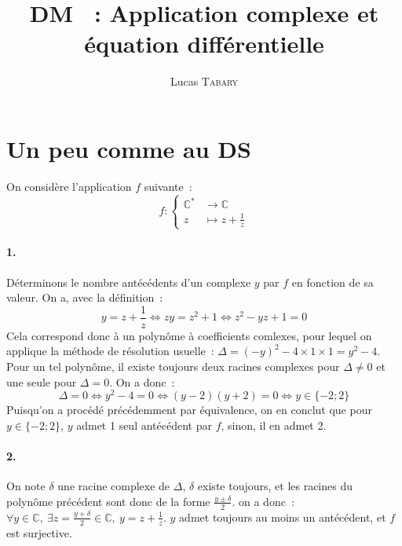 \documentclass{article}
\title{\textbf{DM \No 3~: Application complexe et équation différentielle}}
\author{Lucas \textsc{Tabary}}
\date{}
\begin{document}
  \maketitle
  \hrulefill

  \vspace{2cm}

  \hrulefill

  \section{Un peu comme au DS}
  On considère l'application $f$ suivante~:
    \begin{displaymath}
      f\colon\left\{
      \begin{aligned}
          \mathbb{C}^*\!\!&\longrightarrow \mathbb{C}\\
          z&\longmapsto z+\frac{1}{z}
      \end{aligned}
      \right.
    \end{displaymath}
    \paragraph{1.}
    Déterminons le nombre antécédents d'un complexe $y$ par $f$ en fonction de sa valeur. On a, avec la définition~:
    \begin{displaymath}
      y = z+\frac{1}{z} \iff zy = z^2 + 1 \iff z^2 - yz + 1 = 0
    \end{displaymath}
    Cela correspond donc à un polynôme à coefficients comlexes, pour lequel on applique la méthode de résolution usuelle~: $\Delta = (-y)^2 - 4 \times 1 \times 1 = y^2 - 4$. Pour un tel polynôme, il existe toujours deux racines complexes pour $\Delta \neq 0$ et une seule pour $\Delta = 0$. On a donc~:
    \begin{displaymath}
      \Delta = 0 \iff y^2 - 4 = 0 \iff (y-2)(y+2) = 0 \iff y\in\{-2;2\}
    \end{displaymath}
    Puisqu'on a procédé précédemment par équivalence, on en conclut que pour $y\in\{-2;2\}$, $y$ admet 1 seul antécédent par $f$, sinon, il en admet 2.

    \paragraph{2.}
    On note $\delta$ une racine complexe de $\Delta$, $\delta$ existe toujours, et les racines du polynôme précédent sont donc de la forme $\frac{y\pm\delta}{2}$. on a donc~: $\forall y\in\mathbb{C},\ \exists z=\frac{y+\delta}{2}\in\mathbb{C},\ y = z+\frac{1}{z}$. $y$ admet toujours au moins un antécédent, et $f$ est surjective.
\end{document}

